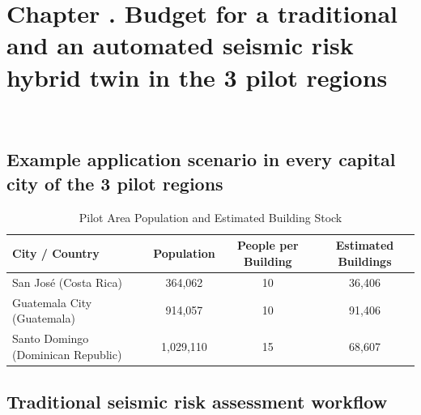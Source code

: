 \renewcommand{\chapternametext}{Chapter \thechapter . Budget for a traditional and an automated seismic risk hybrid twin in the 3 pilot regions}
\renewcommand{\shortchapternametext}{Chapter \thechapter . Budget}


\chapter{\chapternametext}
\


\renewcommand{\headingtextL}{}
\renewcommand{\headingtextR}{\shortchapternametext}
\begingroup
 \flushbottom
 \setlength{\parskip}{0pt plus 1fil}%
 \localtableofcontents 
\endgroup

\begingroup
 \flushbottom
 \setlength{\parskip}{0pt plus 1fil}%
 \locallistoftables
\endgroup


\newpage

\setcounter{section}{0} 

\FloatBarrier

\renewcommand{\sectionnametext}{Example application scenario in every capital city of the 3 pilot regions}
\renewcommand{\headingtextL}{\shortchapternametext}
\renewcommand{\headingtextR}{\thesection. \sectionnametext}
\section{\sectionnametext}

\begin{table}[htbp]
\centering
\caption{Pilot Area Population and Estimated Building Stock}
\begin{tabular}{lccc}
\hline
\textbf{City / Country} & \textbf{Population} & \textbf{People per Building} & \textbf{Estimated Buildings} \\
\hline
San José (Costa Rica) & 364,062 & 10 & 36,406 \\
Guatemala City (Guatemala) & 914,057 & 10 & 91,406 \\
Santo Domingo (Dominican Republic) & 1,029,110 & 15 & 68,607 \\
\hline
\end{tabular}
\label{tab:population_buildings}
\end{table}

\renewcommand{\sectionnametext}{Traditional seismic risk assessment workflow}
\renewcommand{\headingtextR}{\thesection. \sectionnametext}
\section{\sectionnametext}

